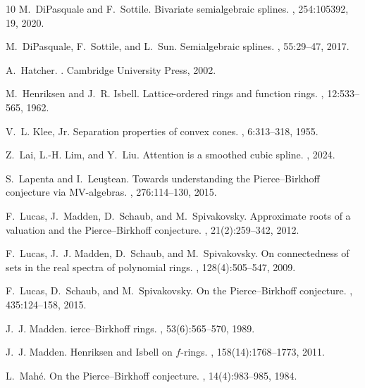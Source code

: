 \documentclass[11pt]{amsart}
\theoremstyle{plain}
\theoremstyle{definition}
\begin{document}
\begin{thebibliography}{10}
M.~DiPasquale and F.~Sottile.
\newblock Bivariate semialgebraic splines.
, 254:105392, 19, 2020.

M.~DiPasquale, F.~Sottile, and L.~Sun.
\newblock Semialgebraic splines.
, 55:29--47, 2017.

A.~Hatcher.
.
\newblock Cambridge University Press, 2002.

M.~Henriksen and J.~R. Isbell.
\newblock Lattice-ordered rings and function rings.
, 12:533--565, 1962.

V.~L. Klee, Jr.
\newblock Separation properties of convex cones.
, 6:313--318, 1955.

Z.~Lai, L.-H. Lim, and Y.~Liu.
\newblock Attention is a smoothed cubic spline.
, 2024.

S.~Lapenta and I.~Leu\c{s}tean.
\newblock Towards understanding the {P}ierce--{B}irkhoff conjecture via
  {MV}-algebras.
, 276:114--130, 2015.

F.~Lucas, J.~Madden, D.~Schaub, and M.~Spivakovsky.
\newblock Approximate roots of a valuation and the {P}ierce--{B}irkhoff
  conjecture.
, 21(2):259--342, 2012.

F.~Lucas, J.~J. Madden, D.~Schaub, and M.~Spivakovsky.
\newblock On connectedness of sets in the real spectra of polynomial rings.
, 128(4):505--547, 2009.

F.~Lucas, D.~Schaub, and M.~Spivakovsky.
\newblock On the {P}ierce--{B}irkhoff conjecture.
, 435:124--158, 2015.

J.~J. Madden.
ierce--{B}irkhoff rings.
, 53(6):565--570, 1989.

J.~J. Madden.
\newblock Henriksen and {I}sbell on {$f$}-rings.
, 158(14):1768--1773, 2011.

L.~Mah\'e.
\newblock On the {P}ierce--{B}irkhoff conjecture.
, 14(4):983--985, 1984.


\end{thebibliography}
\end{document}
